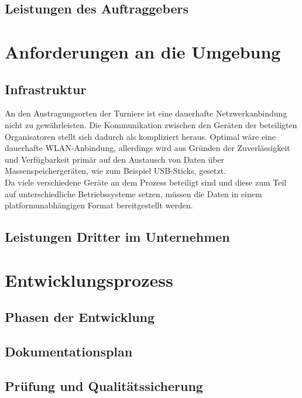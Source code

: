 \documentclass[11pt]{article}
\begin{document}
\subsection{Leistungen des Auftraggebers}

\section{Anforderungen an die Umgebung}

\subsection{Infrastruktur}

An den Austragungsorten der Turniere ist eine dauerhafte Netzwerkanbindung nicht zu gewährleisten. Die Kommunikation zwischen den Geräten der beteiligten Organisatoren stellt sich dadurch als kompliziert heraus. Optimal wäre eine dauerhafte WLAN-Anbindung, allerdings wird aus Gründen der Zuverlässigkeit und Verfügbarkeit primär auf den Austausch von Daten über Massenspeichergeräten, wie zum Beispiel USB-Sticks, gesetzt.\\
Da viele verschiedene Geräte an dem Prozess beteiligt sind und diese zum Teil auf unterschiedliche Betriebssysteme setzen, müssen die Daten in einem platformunabhängigen Format bereitgestellt werden.

\subsection{Leistungen Dritter im Unternehmen}

\section{Entwicklungsprozess}

\subsection{Phasen der Entwicklung}

\subsection{Dokumentationsplan}

\subsection{Prüfung und Qualitätssicherung}
\end{document}
